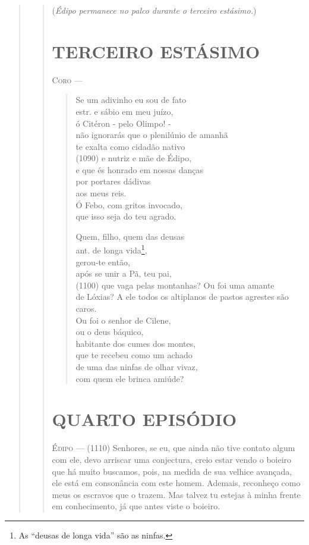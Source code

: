 \begin{verse}
\begin{verse}
(\emph{Édipo permanece no palco durante o terceiro estásimo.})

\section{TERCEIRO ESTÁSIMO}

\textsc{Coro} --- \begin{verse}Se um adivinho eu sou de fato\\ estr.
e sábio em meu juízo,\\
ó Citéron - pelo Olimpo! -\\
não ignorarás que o plenilúnio de amanhã\\
te exalta como cidadão nativo\\ (1090)
e nutriz e mãe de Édipo,\\
e que és honrado em nossas danças\\
por portares dádivas\\
aos meus reis.\\
Ó Febo, com gritos invocado,\\
que isso seja do teu agrado.

Quem, filho, quem das deusas\\ ant.
de longa vida\footnote{As ``deusas de longa vida'' são as ninfas.},\\
gerou-te então,\\
após se unir a Pã, teu pai,\\ (1100)
que vaga pelas montanhas? Ou foi uma amante\\
de Lóxias? A ele todos os altiplanos de pastos agrestes são caros.\\
Ou foi o senhor de Cilene,\\
ou o deus báquico,\\
habitante dos cumes dos montes,\\
que te recebeu como um achado\\
de uma das ninfas de olhar vivaz,\\
com quem ele brinca amiúde?
\end{verse}


\section{QUARTO EPISÓDIO}

\textsc{Édipo} --- (1110) Senhores, se eu, que ainda não tive contato algum com ele, devo
arriscar uma conjectura, creio estar vendo o boieiro que há muito
buscamos, pois, na medida de sua velhice avançada, ele está em
consonância com este homem. Ademais, reconheço como meus os escravos que
o trazem. Mas talvez tu estejas à minha frente em conhecimento, já que
antes viste o boieiro.


\end{verse}
\end{verse}
